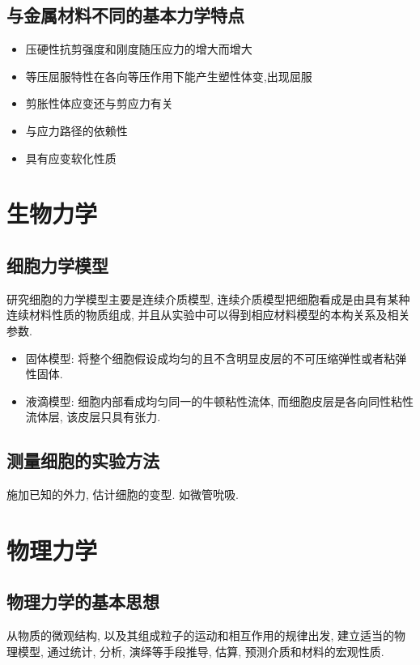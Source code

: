 \documentclass[a4paper,titlepage,twocolumn]{article}
\begin{document}
\subsection{与金属材料不同的基本力学特点}
\begin{itemize}
\item 压硬性抗剪强度和刚度随压应力的增大而增大
\item 等压屈服特性在各向等压作用下能产生塑性体变,出现屈服
\item 剪胀性体应变还与剪应力有关
\item 与应力路径的依赖性
\item 具有应变软化性质
\end{itemize}

\section{生物力学}
\subsection{细胞力学模型}
研究细胞的力学模型主要是连续介质模型, 连续介质模型把细胞看成是由具有某种连续材料性质的物质组成, 并且从实验中可以得到相应材料模型的本构关系及相关参数.
\begin{itemize}
\item 固体模型: 将整个细胞假设成均匀的且不含明显皮层的不可压缩弹性或者粘弹性固体.
\item 液滴模型: 细胞内部看成均匀同一的牛顿粘性流体, 而细胞皮层是各向同性粘性流体层, 该皮层只具有张力.
\end{itemize}


\subsection{测量细胞的实验方法}
施加已知的外力, 估计细胞的变型. 如微管吮吸.


\section{物理力学}

\subsection{物理力学的基本思想}
从物质的微观结构, 以及其组成粒子的运动和相互作用的规律出发, 建立适当的物理模型, 通过统计, 分析, 演绎等手段推导, 估算, 预测介质和材料的宏观性质.
\end{document}
